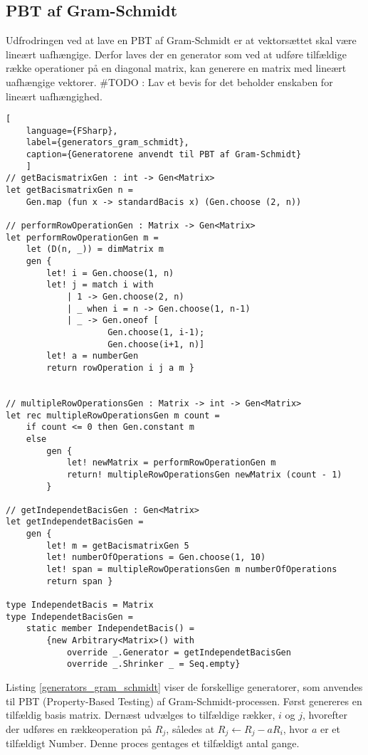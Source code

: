 \subsection{PBT af Gram-Schmidt}
Udfrodringen ved at lave en PBT af Gram-Schmidt er at vektorsættet skal være lineært uafhængige. Derfor laves der en generator som ved at udføre tilfældige række operationer på en diagonal matrix, kan generere en matrix med lineært uafhængige vektorer. 
\#TODO : Lav et bevis for det beholder enskaben for lineært uafhængighed.

\begin{lstlisting}[
    language={FSharp}, 
    label={generators_gram_schmidt}, 
    caption={Generatorene anvendt til PBT af Gram-Schmidt}
    ]
// getBacismatrixGen : int -> Gen<Matrix>
let getBacismatrixGen n =
    Gen.map (fun x -> standardBacis x) (Gen.choose (2, n))

// performRowOperationGen : Matrix -> Gen<Matrix>
let performRowOperationGen m =
    let (D(n, _)) = dimMatrix m
    gen { 
        let! i = Gen.choose(1, n)
        let! j = match i with
            | 1 -> Gen.choose(2, n)
            | _ when i = n -> Gen.choose(1, n-1)
            | _ -> Gen.oneof [
                    Gen.choose(1, i-1); 
                    Gen.choose(i+1, n)]
        let! a = numberGen
        return rowOperation i j a m }


// multipleRowOperationsGen : Matrix -> int -> Gen<Matrix>
let rec multipleRowOperationsGen m count =
    if count <= 0 then Gen.constant m
    else
        gen {
            let! newMatrix = performRowOperationGen m
            return! multipleRowOperationsGen newMatrix (count - 1)
        }

// getIndependetBacisGen : Gen<Matrix>
let getIndependetBacisGen =
    gen { 
        let! m = getBacismatrixGen 5
        let! numberOfOperations = Gen.choose(1, 10)
        let! span = multipleRowOperationsGen m numberOfOperations
        return span }

type IndependetBacis = Matrix
type IndependetBacisGen =
    static member IndependetBacis() =
        {new Arbitrary<Matrix>() with
            override _.Generator = getIndependetBacisGen
            override _.Shrinker _ = Seq.empty}
\end{lstlisting}

Listing \ref{generators_gram_schmidt} viser de forskellige generatorer, som anvendes til PBT (Property-Based Testing) af Gram-Schmidt-processen. Først genereres en tilfældig basis matrix. Dernæst udvælges to tilfældige rækker, \(i\) og \(j\), hvorefter der udføres en rækkeoperation på \(R_j\), således at \(R_j \leftarrow R_j - aR_i\), hvor $a$ er et tilfældigt Number. Denne proces gentages et tilfældigt antal gange.

